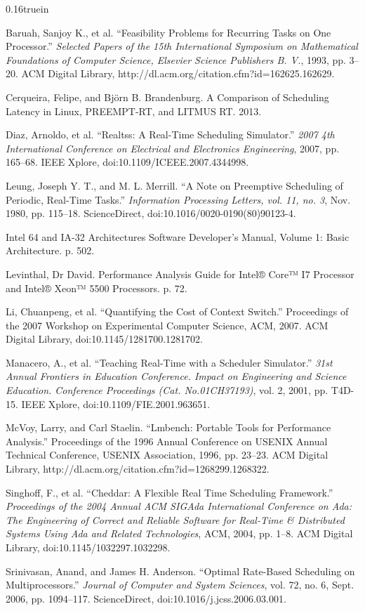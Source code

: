 \documentclass[11pt]{article}
\newcommand{\singlespace}{\baselineskip0.16truein}
\begin{document}

\begin{thebibliography}{99}%
	\singlespace
	
	 Baruah, Sanjoy K., et al. ``Feasibility Problems for Recurring Tasks on One Processor.'' {\em Selected Papers of the 15th International Symposium on Mathematical Foundations of Computer Science, Elsevier Science Publishers B. V.}, 1993, pp. 3–20. ACM Digital Library, http://dl.acm.org/citation.cfm?id=162625.162629.
	
	 Cerqueira, Felipe, and Björn B. Brandenburg. A Comparison of Scheduling Latency in Linux, PREEMPT-RT, and LITMUS RT. 2013.
		
	 Diaz, Arnoldo, et al. ``Realtss: A Real-Time Scheduling Simulator.'' {\em 2007 4th International Conference on Electrical and Electronics Engineering}, 2007, pp. 165–68. IEEE Xplore, doi:10.1109/ICEEE.2007.4344998.
	
	 Leung, Joseph Y. T., and M. L. Merrill. ``A Note on Preemptive Scheduling of Periodic, Real-Time Tasks.'' {\em Information Processing Letters, vol. 11, no. 3}, Nov. 1980, pp. 115–18. ScienceDirect, doi:10.1016/0020-0190(80)90123-4.
	
	 Intel 64 and IA-32 Architectures Software Developer’s Manual, Volume 1: Basic Architecture. p. 502.	
	
	 Levinthal, Dr David. Performance Analysis Guide for Intel® Core™ I7 Processor and Intel® Xeon™ 5500 Processors. p. 72.

	 Li, Chuanpeng, et al. ``Quantifying the Cost of Context Switch.'' Proceedings of the 2007 Workshop on Experimental Computer Science, ACM, 2007. ACM Digital Library, doi:10.1145/1281700.1281702.
	
	 Manacero, A., et al. ``Teaching Real-Time with a Scheduler Simulator.'' {\em 31st Annual Frontiers in Education Conference. Impact on Engineering and Science Education. Conference Proceedings (Cat. No.01CH37193)}, vol. 2, 2001, pp. T4D-15. IEEE Xplore, doi:10.1109/FIE.2001.963651.
	
	 McVoy, Larry, and Carl Staelin. ``Lmbench: Portable Tools for Performance Analysis.'' Proceedings of the 1996 Annual Conference on USENIX Annual Technical Conference, USENIX Association, 1996, pp. 23–23. ACM Digital Library, http://dl.acm.org/citation.cfm?id=1268299.1268322.
	
	 Singhoff, F., et al. ``Cheddar: A Flexible Real Time Scheduling Framework.'' {\em Proceedings of the 2004 Annual ACM SIGAda International Conference on Ada: The Engineering of Correct and Reliable Software for Real-Time \& Distributed Systems Using Ada and Related Technologies}, ACM, 2004, pp. 1–8. ACM Digital Library, doi:10.1145/1032297.1032298.
	
	 Srinivasan, Anand, and James H. Anderson. ``Optimal Rate-Based Scheduling on Multiprocessors.'' {\em Journal of Computer and System Sciences}, vol. 72, no. 6, Sept. 2006, pp. 1094–117. ScienceDirect, doi:10.1016/j.jcss.2006.03.001.
\end{thebibliography}
\end{document}
